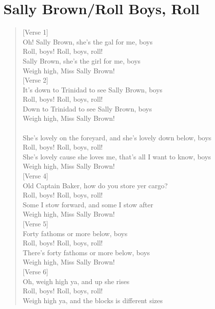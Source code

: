 \documentclass[11pt]{article}
\begin{document}
\section{Sally Brown/Roll Boys, Roll}
\label{sec:orgc563973}
\begin{verse}
[Verse 1]\\
Oh! Sally Brown, she's the gal for me, boys\\
Roll, boys! Roll, boys, roll!\\
Sally Brown, she's the girl for me, boys\\
Weigh high, Miss Sally Brown!\\
\vspace*{1em}
[Verse 2]\\
It's down to Trinidad to see Sally Brown, boys\\
Roll, boys! Roll, boys, roll!\\
Down to Trinidad to see Sally Brown, boys\\
Weigh high, Miss Sally Brown!\\
[Verse 3]\\
She's lovely on the foreyard, and she's lovely down below, boys\\
Roll, boys! Roll, boys, roll!\\
She's lovely cause she loves me, that's all I want to know, boys\\
Weigh high, Miss Sally Brown!\\
\vspace*{1em}
[Verse 4]\\
Old Captain Baker, how do you store yer cargo?\\
Roll, boys! Roll, boys, roll!\\
Some I stow forward, and some I stow after\\
Weigh high, Miss Sally Brown!\\
\vspace*{1em}
[Verse 5]\\
Forty fathoms or more below, boys\\
Roll, boys! Roll, boys, roll!\\
There's forty fathoms or more below, boys\\
Weigh high, Miss Sally Brown!\\
\vspace*{1em}
[Verse 6]\\
Oh, weigh high ya, and up she rises\\
Roll, boys! Roll, boys, roll!\\
Weigh high ya, and the blocks is different sizes\\

\end{verse}
\end{document}
